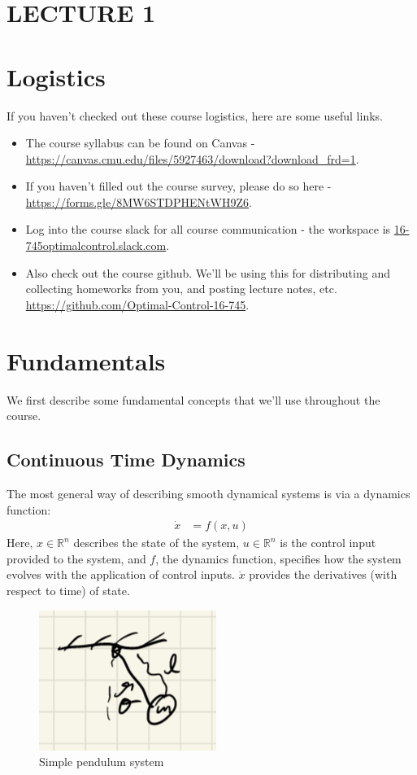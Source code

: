 \section*{LECTURE 1}
\section{Logistics}
If you haven't checked out these course logistics, here are some useful links.
\begin{itemize}
    \item The course syllabus can be found on Canvas - \url{https://canvas.cmu.edu/files/5927463/download?download_frd=1}.
    \item If you haven't filled out the course survey, please do so here - \url{https://forms.gle/8MW6STDPHENtWH9Z6}. 
    \item Log into the course slack for all course communication - the workspace is \url{16-745optimalcontrol.slack.com}.
    \item Also check out the course github. We’ll be using this for distributing and collecting homeworks from you, and posting lecture notes, etc. \url{https://github.com/Optimal-Control-16-745}.
\end{itemize}

\section{Fundamentals}
We first describe some fundamental concepts that we'll use throughout the course. 

\subsection{Continuous Time Dynamics}
The most general way of describing smooth dynamical systems is via a dynamics function: 
\begin{align}
    \dot{x} &= f(x, u)
\end{align}
Here, $x \in \mathbb{R}^n$ describes the state of the system, $u \in \mathbb{R}^n$ is the control input provided to the system, and $f$, the dynamics function, specifies how the system evolves with the application of control inputs. 
$\dot{x}$ provides the derivatives (with respect to time) of state. \\

\begin{figure}
    \centering
    \includegraphics[]{L1_Images/F1.PNG}
    \caption{Simple pendulum system}
    \label{fig:f1}
\end{figure}

